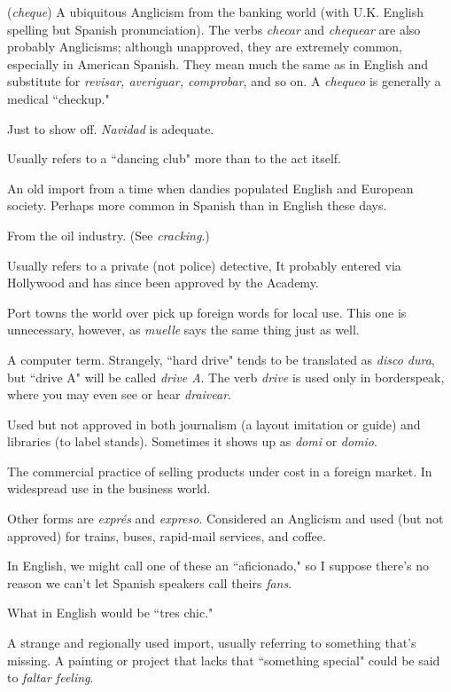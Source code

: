  (\emph{cheque}) A ubiquitous Anglicism from the banking world (with U.K. English spelling but Spanish pronunciation). The
verbs \emph{checar} and \emph{chequear} are also probably Anglicisms; although unapproved, they are extremely common, especially in American Spanish. They mean much the same as in English and substitute for \emph{revisar,
	averiguar, comprobar}, and so on. A \emph{chequeo} is generally a medical
``checkup."

 Just to show off. \emph{Navidad} is adequate.

 Usually refers to a ``dancing club" more than to
the act itself.

 An old import from a time when dandies populated
English and European society. Perhaps more common in Spanish than
in English these days.

 From the oil industry. (See \emph{cracking}.)

 Usually refers to a private (not police) detective,
It probably entered via Hollywood and has since been approved by the
Academy.

 Port towns the world over pick up foreign words for local use. This one is unnecessary, however, as \emph{muelle} says the same
thing just as well.

 A computer term. Strangely, ``hard drive" tends to be
translated as \emph{disco dura}, but ``drive A" will be called \emph{drive A}. The
verb \emph{drive} is used only in borderspeak, where you may even see or hear
\emph{draivear}.

 Used but not approved in both journalism (a layout
imitation or guide) and libraries (to label stands). Sometimes it shows
up as \emph{domi} or \emph{domio}.

 The commercial practice of selling products under
cost in a foreign market. In widespread use in the business world.

 Other forms are \emph{exprés} and \emph{expreso}. Considered an
Anglicism and used (but not approved) for trains, buses, rapid-mail services, and coffee.

 In English, we might call one of these an ``aficionado,"
so I suppose there's no reason we can't let Spanish speakers call
theirs \emph{fans}.

 What in English would be ``tres chic."

 A strange and regionally used import, usually referring to something that's missing. A painting or project that lacks that
``something special" could be said to \emph{faltar feeling}.

